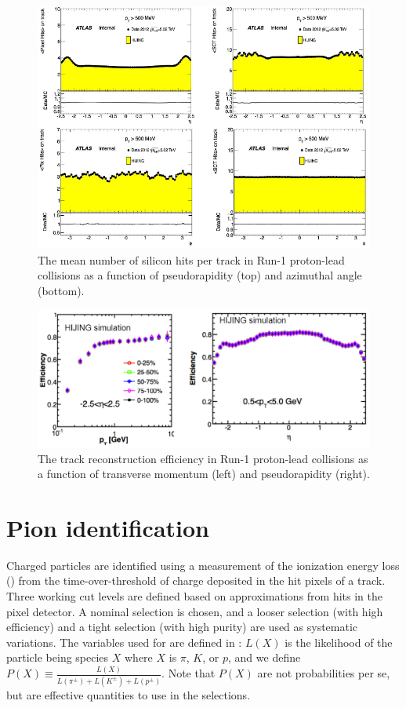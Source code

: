 \begin{figure}[t]
  \includegraphics[width=\linewidth]{ATL-COM-PHYS-2013-1017_sihits.png}
  \caption{The mean number of silicon hits per track in Run-1 proton-lead collisions as a function of pseudorapidity (top) and azimuthal angle (bottom).}
  \label{fig:trk_si_hits}
\end{figure}

\begin{figure}[t]
  \includegraphics[width=\linewidth]{ATL-COM-PHYS-2013-011_trk_eff.png}
  \caption{The track reconstruction efficiency in Run-1 proton-lead collisions as a function of transverse momentum (left) and pseudorapidity (right).}
  \label{fig:trk_eff}
\end{figure}

\section{Pion identification}
\label{sec:pid}

Charged particles are identified using a measurement of the ionization energy loss (\dEdx) from the time-over-threshold of charge deposited in the hit pixels of a track.
Three working \pid cut levels are defined based on \dEdx approximations from hits in the pixel detector.
A nominal selection is chosen, and a looser selection (with high efficiency) and a tight selection (with high purity) are used as systematic variations.
The variables used for \pid are defined in : $L(X)$ is the likelihood of the particle being species $X$ where $X$ is $\pi$, $K$, or $p$, and we define $P(X) \equiv \frac{L(X)}{L(\pi^{\pm}) + L(K^{\pm}) +L(p^{\pm})}$.
Note that $P(X)$ are not probabilities per se, but are effective quantities to use in the selections.

